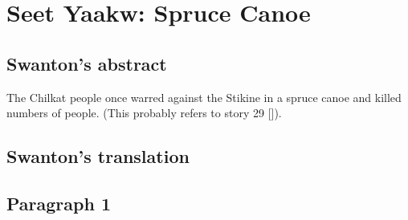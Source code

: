 
\resetexcnt
\chapter{Seet Yaakw: Spruce Canoe}\label{ch:103-spruce-canoe}

\section{Swanton’s abstract}\label{sec:103-swanton-abstract}

The Chilkat people once warred against the Stikine in a spruce canoe and killed numbers of people. (This probably refers to story 29 [\cite[72–79, 428]{swanton:1909}]).

\section{Swanton’s translation}\label{sec:103-swanton-translation}

\section{Paragraph 1}\label{sec:103-para-1}

